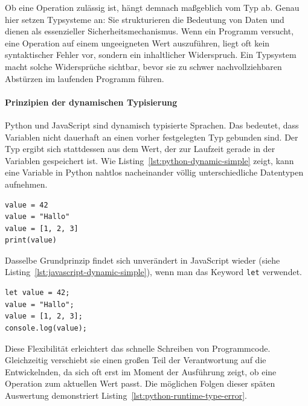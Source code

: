 Ob eine Operation zulässig ist, hängt demnach maßgeblich vom Typ ab. Genau hier setzen Typsysteme an: Sie strukturieren die Bedeutung von Daten und dienen als essenzieller Sicherheitsmechanismus. Wenn ein Programm versucht, eine Operation auf einem ungeeigneten Wert auszuführen, liegt oft kein syntaktischer Fehler vor, sondern ein inhaltlicher Widerspruch. Ein Typsystem macht solche Widersprüche sichtbar, bevor sie zu schwer nachvollziehbaren Abstürzen im laufenden Programm führen. 

\paragraph{Prinzipien der dynamischen Typisierung}
\label{par:dynamische-typisierung}

Python und JavaScript sind dynamisch typisierte Sprachen. Das bedeutet, dass Variablen nicht dauerhaft an einen vorher festgelegten Typ gebunden sind. Der Typ ergibt sich stattdessen aus dem Wert, der zur Laufzeit gerade in der Variablen gespeichert ist. Wie Listing~\ref{lst:python-dynamic-simple} zeigt, kann eine Variable in Python nahtlos nacheinander völlig unterschiedliche Datentypen aufnehmen.

\begin{listing}[htbp]
    \caption{Dynamische Typisierung in Python}
    \label{lst:python-dynamic-simple}
    \begin{verbatim}
value = 42
value = "Hallo"
value = [1, 2, 3]
print(value)
    \end{verbatim}
\end{listing}

Dasselbe Grundprinzip findet sich unverändert in JavaScript wieder (siehe Listing~\ref{lst:javascript-dynamic-simple}), wenn man das Keyword \texttt{let} verwendet.

\begin{listing}[htbp]
    \caption{Dynamische Typisierung in JavaScript}
    \label{lst:javascript-dynamic-simple}
    \begin{verbatim}
let value = 42;
value = "Hallo";
value = [1, 2, 3];
console.log(value);
    \end{verbatim}
\end{listing}

Diese Flexibilität erleichtert das schnelle Schreiben von Programmcode. Gleichzeitig verschiebt sie einen großen Teil der Verantwortung auf die Entwickelnden, da sich oft erst im Moment der Ausführung zeigt, ob eine Operation zum aktuellen Wert passt. Die möglichen Folgen dieser späten Auswertung demonstriert Listing~\ref{lst:python-runtime-type-error}.

